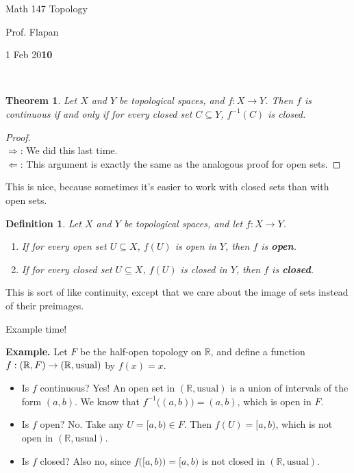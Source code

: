 \documentclass[11pt]{amsart}
\newtheorem*{theorem}{Theorem}
\newtheorem*{defn}{Definition}
\newcommand{\ex}{ {\bf Example.} }
\newcommand{\R}{\mathbb R}
\begin{document}
\begin{center}
{\LARGE Math 147 Topology}

{\Large Prof. Flapan}

{\Large 1 Feb 20{\bf10}}
\end{center}

\mbox{ }

\begin{theorem}
Let $X$ and $Y$ be topological spaces, and $f:X\to Y$.  Then $f$ is continuous if and only if for every closed set $C\subseteq Y$, $f^{-1}(C)$ is closed.
\end{theorem}
\begin{proof}\mbox{ }\\
$\Rightarrow$: We did this last time. \\
$\Leftarrow$: This argument is exactly the same as the analogous proof for open sets.
\end{proof}

This is nice, because sometimes it's easier to work with closed sets than with open sets.

\begin{defn}
Let $X$ and $Y$ be topological spaces, and let $f:X\to Y$.  
\begin{enumerate}
\item If for every open set $U\subseteq X$, $f(U)$ is open in $Y$, then $f$ is {\bf open}.
\item If for every closed set $U\subseteq X$, $f(U)$ is closed in $Y$, then $f$ is {\bf closed}.
\end{enumerate}
\end{defn}

This is sort of like continuity, except that we care about the image of sets instead of their preimages.

Example time!

\ex
Let $F$ be the half-open topology on $\R$, and define a function $\nobreak{f:(\R,F)\to(\R,\text{usual})}$ by $f(x) = x$.
\begin{itemize}
\item Is $f$ continuous?  Yes!  An open set in $(\R, \text{usual})$ is a union of intervals of the form $(a,b)$.  We know that $f^{-1}\big((a,b)\big) = (a,b)$, which is open in $F$.
\item Is $f$ open?  No.  Take any $U = [a,b) \in F$.  Then $f(U) = [a,b)$, which is not open in $(\R, \text{usual})$.
\item Is $f$ closed? Also no, since $f\big([a,b)\big) = [a,b)$ is not closed in $(\R, \text{usual})$.
\end{itemize}
\end{document}
